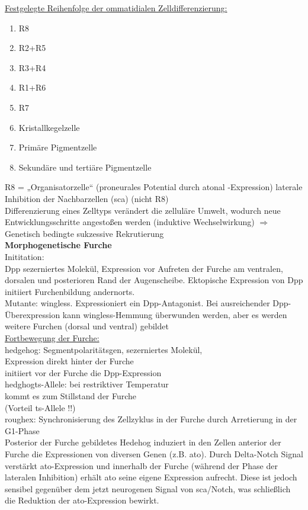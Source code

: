 \documentclass[12pt,a4paper]{article}
\begin{document}
\underline{Festgelegte Reihenfolge der ommatidialen Zelldifferenzierung:}
\begin{enumerate}
	\item R8
	\item R2+R5
	\item R3+R4
	\item R1+R6
	\item R7
	\item Kristallkegelzelle
	\item Primäre Pigmentzelle
	\item Sekundäre und tertiäre Pigmentzelle
\end{enumerate}
R8 = „Organisatorzelle“ (proneurales Potential durch atonal -Expression) laterale Inhibition der Nachbarzellen (sca) (nicht R8)\\

Differenzierung eines Zelltyps verändert die zelluläre Umwelt, wodurch neue Entwicklungsschritte angestoßen werden (induktive Wechselwirkung) $\Rightarrow$
Genetisch bedingte sukzessive Rekrutierung\\

\textbf{Morphogenetische Furche}\\
Inititation:\\
Dpp sezerniertes Molekül, Expression vor Aufreten der Furche am ventralen, dorsalen und posterioren Rand der Augenscheibe. Ektopische Expression von Dpp initiiert Furchenbildung andernorts.\\

Mutante: wingless. Expressioniert ein Dpp-Antagonist. Bei ausreichender Dpp-Überexpression kann wingless-Hemmung überwunden werden, aber es werden weitere Furchen (dorsal und ventral) gebildet\\

\underline{Fortbewegung der Furche:}\\
hedgehog: Segmentpolaritätsgen, sezerniertes Molekül,\\
Expression direkt hinter der Furche\\
initiiert vor der Furche die Dpp-Expression\\
hedghogts-Allele: bei restriktiver Temperatur\\
kommt es zum Stillstand der Furche\\
(Vorteil ts-Allele !!)\\
roughex: Synchronisierung des Zellzyklus in der Furche durch Arretierung in der G1-Phase\\
Posterior der Furche gebildetes Hedehog induziert in den Zellen anterior der Furche die Expressionen von diversen Genen (z.B. ato). Durch Delta-Notch Signal verstärkt ato-Expression und innerhalb der Furche (während der Phase der lateralen Inhibition) erhält ato seine eigene Expression aufrecht. Diese ist jedoch sensibel gegenüber dem jetzt neurogenen Signal von sca/Notch, was schließlich die Reduktion der ato-Expression bewirkt.\\
\end{document}
